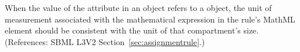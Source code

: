 When the value of the attribute  in an \AssignmentRule
object refers to a \Compartment object, the unit of measurement associated
with the mathematical expression in the rule's MathML  element
should be consistent with the unit of that compartment's size.
(References: SBML L3V2 Section~\ref{sec:assignmentrule}.)
